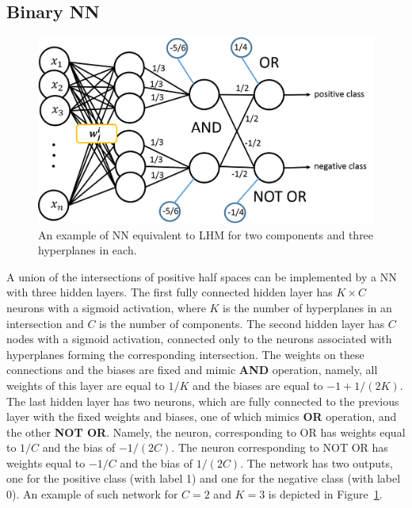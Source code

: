 \documentclass[twoside,11pt]{article}
\begin{document}
\subsection{Binary NN}\label{sec:binary_nn}
\begin{figure}
\center
  \includegraphics[width=0.7\linewidth]{LHM_NN_arch.png}
  \caption{An example of NN equivalent to LHM for two components and three hyperplanes in each.} %
  \label{fig:LHM_NN}
\end{figure}
 A union of the intersections of positive half spaces can be implemented by a NN with three hidden layers. The first fully connected hidden layer has $K\times C$ neurons with a sigmoid activation, where $K$ is the number of hyperplanes in an intersection and $C$ is the number of components. The second hidden layer has $C$ nodes with a sigmoid activation, connected only to the neurons associated with hyperplanes forming the corresponding intersection. The weights on these connections and the biases are fixed and mimic \textbf{AND} operation, namely, all weights of this layer are equal to $1/K$ and the biases are equal to $-1+1/(2K)$.  The last hidden layer has two neurons, which are fully connected to the previous layer with the fixed weights and biases, one of which mimics \textbf{OR} operation, and the other  \textbf{NOT OR}. Namely, the neuron, corresponding to OR has  weights equal to $1/C$   and the bias of $-1/(2C)$. The neuron corresponding to NOT OR  has weights equal to $-1/C$ and the bias of $1/(2C)$.  The network has two outputs, one for the positive class (with label 1) and one for the negative class (with label 0). An example of such network for $C=2$ and $K=3$ is depicted in Figure~\ref{fig:LHM_NN}.
\end{document}
